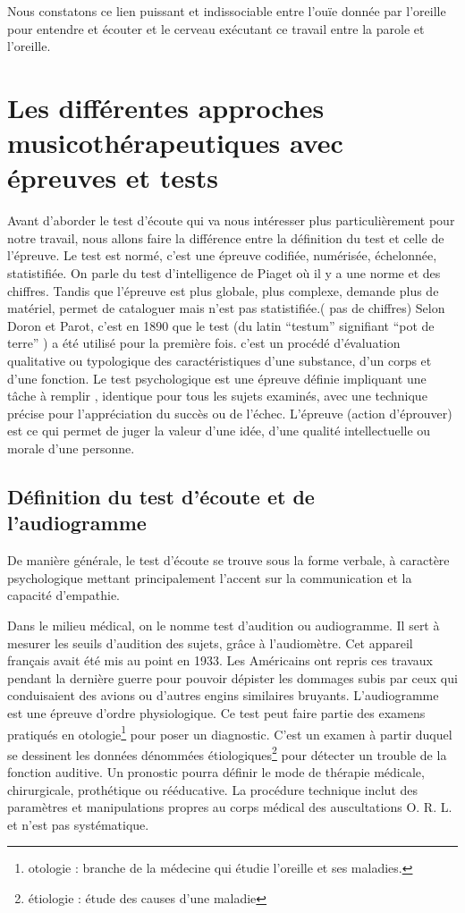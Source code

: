 Nous constatons ce lien puissant et indissociable  entre l'ouïe donnée
par l'oreille pour entendre et écouter et le cerveau exécutant ce
travail entre la 
parole et l'oreille.








\chapter{Les différentes approches musicothérapeutiques avec épreuves
  et tests}
Avant d'aborder le test d'écoute qui va nous intéresser plus
particulièrement pour notre travail, nous allons faire la différence
entre la définition du test et celle de l'épreuve.
Le test est normé, c'est une épreuve codifiée, numérisée, échelonnée,
statistifiée. On parle du test d'intelligence de Piaget où il y a une
norme et des chiffres. Tandis que l'épreuve est plus globale, plus complexe,
demande plus de matériel, permet de
cataloguer mais n'est pas statistifiée.( pas de chiffres)
Selon Doron et Parot, c'est en 1890 que le test (du latin ``testum''
signifiant ``pot de terre'' ) a été utilisé pour la
première fois. c'est un procédé d'évaluation qualitative ou
typologique des caractéristiques d'une substance, d'un corps et d'une
fonction.
Le test psychologique est une épreuve définie impliquant une tâche à
remplir , identique pour tous les sujets examinés, avec une technique
précise pour l'appréciation du succès ou de l'échec.
L'épreuve (action d'éprouver) est ce qui permet de juger la valeur
d'une idée, d'une qualité intellectuelle ou morale d'une personne.

\section{Définition du test d'écoute et de l'audiogramme}

De manière générale, le test d'écoute se trouve sous la forme verbale,
à caractère  
psychologique mettant principalement l'accent sur la communication
et la capacité d'empathie.

Dans le milieu médical, on le nomme test d'audition ou audiogramme. Il
sert à mesurer les seuils d'audition des sujets, grâce à l'audiomètre. Cet 
appareil français avait été mis au point en 1933. Les Américains
ont repris ces travaux pendant la dernière guerre pour pouvoir dépister
les dommages subis par ceux qui conduisaient des avions ou d'autres
engins similaires bruyants.
  L'audiogramme est une épreuve d'ordre physiologique. Ce test peut faire partie des examens  pratiqués en otologie\footnote{otologie : branche de la médecine
  	qui étudie l'oreille et ses maladies.} pour poser un diagnostic. 
   C'est un examen à partir duquel se
  dessinent les données dénommées étiologiques\footnote{étiologie : étude des causes
  	d'une maladie} pour détecter un trouble de la fonction auditive. Un pronostic pourra définir le mode de thérapie
médicale, chirurgicale, prothétique ou rééducative. La procédure
technique inclut des paramètres et manipulations propres au corps
médical des auscultations O. R. L. et  n'est pas systématique.






